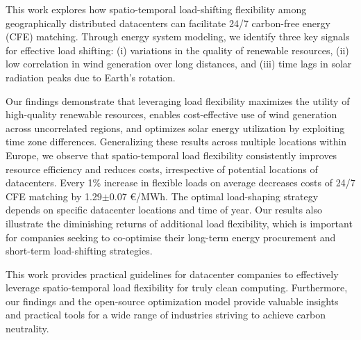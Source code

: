 %

This work explores how spatio-temporal load-shifting flexibility among geographically distributed datacenters can facilitate 24/7 carbon-free energy (CFE) matching. Through energy system modeling, we identify three key signals for effective load shifting: (i) variations in the quality of renewable resources, (ii) low correlation in wind generation over long distances, and (iii) time lags in solar radiation peaks due to Earth's rotation.

Our findings demonstrate that leveraging load flexibility maximizes the utility of high-quality renewable resources, enables cost-effective use of wind generation across uncorrelated regions, and optimizes solar energy utilization by exploiting time zone differences. Generalizing these results across multiple locations within Europe, we observe that spatio-temporal load flexibility consistently improves resource efficiency and reduces costs, irrespective of potential locations of datacenters. Every 1\% increase in flexible loads on average decreases costs of 24/7 CFE matching by 1.29$\pm$0.07 \euro/MWh. The optimal load-shaping strategy depends on specific datacenter locations and time of year. Our results also illustrate the diminishing returns of additional load flexibility, which is important for companies seeking to co-optimise their long-term energy procurement and short-term load-shifting strategies.

This work provides practical guidelines for datacenter companies to effectively leverage spatio-temporal load flexibility for truly clean computing. Furthermore, our findings and the open-source optimization model provide valuable insights and practical tools for a wide range of industries striving to achieve carbon neutrality.